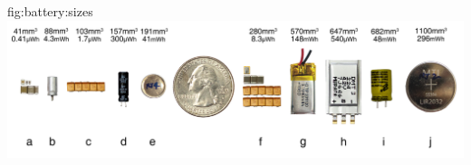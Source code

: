 \begin{definefigure}{fig:battery:sizes}
  \centering
  \includegraphics[width=\columnwidth]{figs/batteries/cap_lto_size_compare}
  \caption{
    A size comparison of energy storage methods including capacitors, supercapacitors, and batteries.
    \normalfont
    They are ordered left to right, by their
    (total) volume. Total volumes are listed above the respective device.
    Configuration
    \textbf{(a)}, \textbf{(c)} and \textbf{(e)} represent the energy storage configurations used
    in the Flicker platfrom with BLE and several sensors~\cite{hesterFlicker17}, the Solar Monjolo~\cite{campbellEnergy14} and the Capybara temperature
    monitor and alarm~\cite{colinReconfigurable18}, which have total
    capacitances and energy capacities of 119\si{\micro\farad} (0.41\si{\micro\Wh} at 5~V), 500\si{\micro\farad} (1.7\si{\micro\Wh} at 5~V)
    and 8.8\si{\milli\farad} (8.3\si{\micro\Wh} at 2.6~V), respectively. Capacitors
    \textbf{(d)}~\cite{illinoisCap} and \textbf{(f)}~\cite{murataCap} are large
    supercapacitors available on the Capybara platform and have the
    capacitances and energy capacities of 300\si{\milli\farad} (300\si{\micro\Wh} at 2.7\si{\volt}) and 220\si{\milli\farad}
    (540\si{\micro\Wh} at 4.2\si{\volt}) respectively.  While all pictured devices are
    similar in size and appearance, \textbf{(b)} and \textbf{(g)} are actually
    small LTO battery cells with 1.8\si{\milli\Ah} (4.3\si{\milli\Wh} at 2.4~V) and 20\si{\milli\Ah} (48\si{\milli\Wh}
    at 2.4\si{\volt}) capacity respectively~\cite{LTODatasheet2}. The LTO battery
    \textbf{(b)} is the second smallest of all configurations of energy storage
    presented here and also provides an order of magnitude more energy capacity
    compared to \textbf{(f)}, the largest supercapacitor presented.
  }
\end{definefigure}

